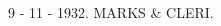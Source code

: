 \documentclass[11pt]{article}
\begin{document}
\begin{multicols*}{2}
\begin{flushright}
9 - 11 - 1932. 
MARKS & CLERI. 
\end{flushright}




 



 
 

 
 



 

 



 
 
 






 




 










\end{multicols*}
\end{document}
